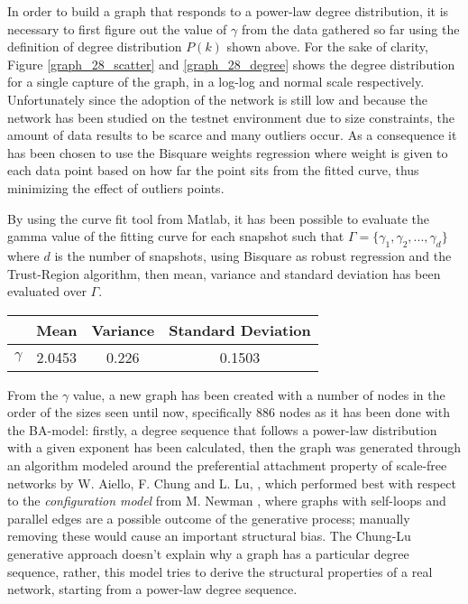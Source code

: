 	In order to build a graph that responds to a power-law degree distribution, it is necessary to first figure out the value of $\gamma$ from the data gathered so far using the definition of degree distribution $P(k)$ shown above. For the sake of clarity, Figure \ref{graph_28_scatter} and \ref{graph_28_degree} shows the degree distribution for a single capture of the graph, in a log-log and normal scale respectively. Unfortunately since the adoption of the network is still low and because the network has been studied on the testnet environment due to size constraints, the amount of data results to be scarce and many outliers occur. As a consequence it has been chosen to use the Bisquare weights regression where weight is given to each data point based on how far the point sits from the fitted curve, thus minimizing the effect of outliers points.
	
	By using the curve fit tool from Matlab, it has been possible to evaluate the gamma value of the fitting curve for each snapshot such that $\Gamma = \{\gamma_1, \gamma_2, ... , \gamma_d\}$ where $d$ is the number of snapshots, using Bisquare as robust regression and the Trust-Region algorithm, then mean, variance and standard deviation has been evaluated over $\Gamma$.
	
	\begin{center}
		\begin{tabulary}{0.75\linewidth}{| L | C | C | C | }
			\hline
			& Mean & Variance & Standard Deviation \\ \hline
			$\gamma$ & 2.0453 & 0.226 & 0.1503  \\ \hline
		\end{tabulary}
	\end{center}
	
	
	From the $\gamma$ value, a new graph has been created with a number of nodes in the order of the sizes seen until now, specifically 886 nodes as it has been done with the BA-model: firstly, a degree sequence that follows a power-law distribution with a given exponent has been calculated, then the graph was generated through an algorithm modeled around the preferential attachment property of scale-free networks by W. Aiello, F. Chung and L. Lu, \cite{Aiello2001} \cite{Chung2002}, which performed best with respect to the \textit{configuration model} from M. Newman \cite{Newman2003}, where graphs with self-loops and parallel edges are a possible outcome of the generative process; manually removing these would cause an important structural bias. The Chung-Lu generative approach doesn't explain why a graph has a particular degree sequence, rather, this model tries to derive the structural properties of a real network, starting from a power-law degree sequence.
	
